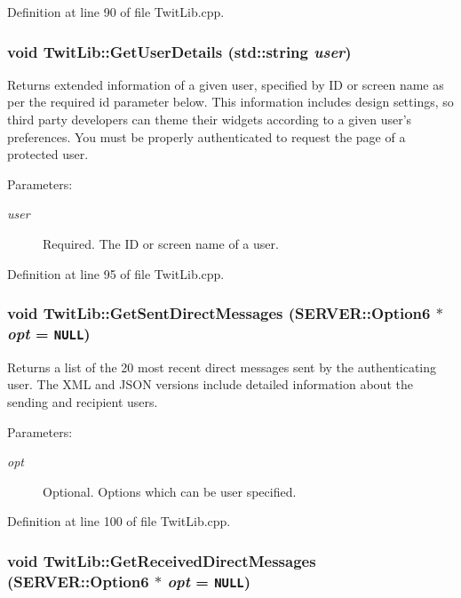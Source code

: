 Definition at line 90 of file TwitLib.cpp.\hypertarget{classTwitLib_87f38173a3602ee392350b17977c99fe}{
\subsubsection{\setlength{\rightskip}{0pt plus 5cm}void TwitLib::GetUserDetails (std::string {\em user})}}
\label{classTwitLib_87f38173a3602ee392350b17977c99fe}


Returns extended information of a given user, specified by ID or screen name as per the required id parameter below. This information includes design settings, so third party developers can theme their widgets according to a given user's preferences. You must be properly authenticated to request the page of a protected user. \begin{Desc}
\item[Parameters:]
\begin{description}
\item[{\em user}]Required. The ID or screen name of a user. \end{description}
\end{Desc}


Definition at line 95 of file TwitLib.cpp.\hypertarget{classTwitLib_23f41783466fe193e6d2394475d9e282}{
\subsubsection{\setlength{\rightskip}{0pt plus 5cm}void TwitLib::GetSentDirectMessages ({\bf SERVER::Option6} $\ast$ {\em opt} = {\tt NULL})}}
\label{classTwitLib_23f41783466fe193e6d2394475d9e282}


Returns a list of the 20 most recent direct messages sent by the authenticating user. The XML and JSON versions include detailed information about the sending and recipient users. \begin{Desc}
\item[Parameters:]
\begin{description}
\item[{\em opt}]Optional. Options which can be user specified. \end{description}
\end{Desc}


Definition at line 100 of file TwitLib.cpp.\hypertarget{classTwitLib_6a98347a2c1e93dff60543a6a45da4b3}{
\subsubsection{\setlength{\rightskip}{0pt plus 5cm}void TwitLib::GetReceivedDirectMessages ({\bf SERVER::Option6} $\ast$ {\em opt} = {\tt NULL})}}
\label{classTwitLib_6a98347a2c1e93dff60543a6a45da4b3}


